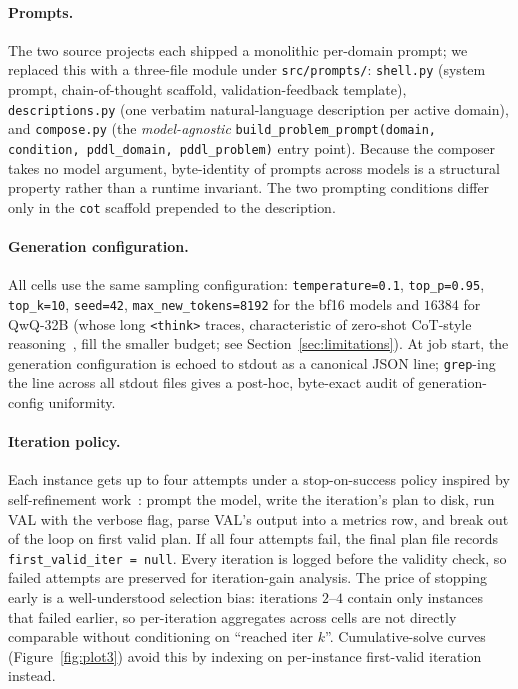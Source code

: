 \paragraph{Prompts.}
The two source projects each shipped a monolithic per-domain prompt;
we replaced this with a three-file module under
\texttt{src/prompts/}: \texttt{shell.py} (system prompt,
chain-of-thought scaffold, validation-feedback template),
\texttt{descriptions.py} (one verbatim natural-language description per
active domain), and \texttt{compose.py} (the \emph{model-agnostic}
\texttt{build\_problem\_prompt(domain, condition, pddl\_domain,
pddl\_problem)} entry point). Because the composer takes no model
argument, byte-identity of prompts across models is a structural
property rather than a runtime invariant. The two prompting conditions
differ only in the \texttt{cot} scaffold prepended to the description.

\paragraph{Generation configuration.}
All cells use the same sampling configuration: \texttt{temperature=0.1},
\texttt{top\_p=0.95}, \texttt{top\_k=10}, \texttt{seed=42},
\texttt{max\_new\_tokens=8192} for the bf16 models and $16384$
for QwQ-32B (whose long \texttt{<think>} traces, characteristic of
zero-shot CoT-style reasoning~\cite{kojima2022zeroshot}, fill the
smaller budget; see Section~\ref{sec:limitations}). At job start, the
generation configuration is echoed to stdout as a canonical JSON line;
\texttt{grep}-ing the line across all stdout files gives a post-hoc,
byte-exact audit of generation-config uniformity.

\paragraph{Iteration policy.}
Each instance gets up to four attempts under a stop-on-success policy
inspired by self-refinement work~\cite{madaan2023selfrefine}:
prompt the model, write the iteration's plan to disk, run VAL with the
verbose flag, parse VAL's output into a metrics row, and break out of
the loop on first valid plan. If all four attempts fail, the
final plan file records \texttt{first\_valid\_iter = null}. Every
iteration is logged before the validity check, so failed attempts are
preserved for iteration-gain analysis. The price of stopping early is
a well-understood selection bias: iterations $2$--$4$ contain only
instances that failed earlier, so per-iteration aggregates across cells
are not directly comparable without conditioning on
``reached iter $k$''. Cumulative-solve curves
(Figure~\ref{fig:plot3}) avoid this by indexing on per-instance
first-valid iteration instead.

